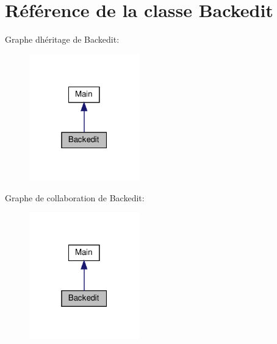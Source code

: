 \hypertarget{class_src_1_1_controllers_1_1_backedit}{}\section{Référence de la classe Backedit}
\label{class_src_1_1_controllers_1_1_backedit}


Graphe d\textquotesingle{}héritage de Backedit\+:
\nopagebreak
\begin{figure}[H]
\begin{center}
\leavevmode
\includegraphics[width=135pt]{d2/d90/class_src_1_1_controllers_1_1_backedit__inherit__graph}
\end{center}
\end{figure}


Graphe de collaboration de Backedit\+:
\nopagebreak
\begin{figure}[H]
\begin{center}
\leavevmode
\includegraphics[width=135pt]{d0/dbb/class_src_1_1_controllers_1_1_backedit__coll__graph}
\end{center}
\end{figure}
